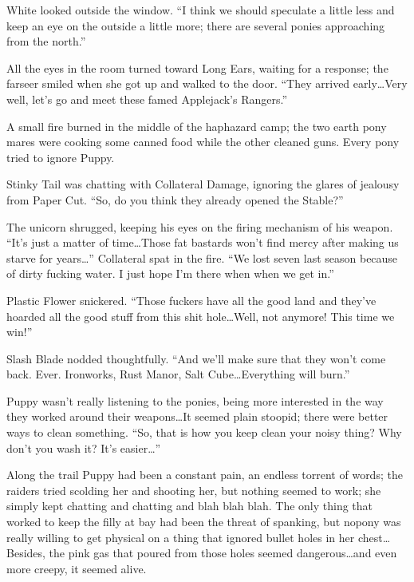 White looked outside the window. ``I think we should speculate a little less and keep an eye on the outside a little more; there are several ponies approaching from the north.''

All the eyes in the room turned toward Long Ears, waiting for a response; the farseer smiled when she got up and walked to the door. ``They arrived early\dots Very well, let's go and meet these famed Applejack's Rangers.''

\horizonline


A small fire burned in the middle of the haphazard camp; the two earth pony mares were cooking some canned food while the other cleaned guns. Every pony tried to ignore Puppy.

Stinky Tail was chatting with Collateral Damage, ignoring the glares of jealousy from Paper Cut. ``So, do you think they already opened the Stable?''

The unicorn shrugged, keeping his eyes on the firing mechanism of his weapon. ``It's just a matter of time\dots Those fat bastards won't find mercy after making us starve for years\dots'' Collateral spat in the fire. ``We lost seven last season because of dirty fucking water. I just hope I'm there when when we get in.''

Plastic Flower snickered. ``Those fuckers have all the good land and they've hoarded all the good stuff from this shit hole\dots Well, not anymore! This time we win!''

Slash Blade nodded thoughtfully. ``And we'll make sure that they won't come back. Ever. Ironworks, Rust Manor, Salt Cube\dots Everything will burn.''

Puppy wasn't really listening to the ponies, being more interested in the way they worked around their weapons\dots It seemed plain stoopid; there were better ways to clean something. ``So, that is how you keep clean your noisy thing? Why don't you wash it? It's easier\dots''

Along the trail Puppy had been a constant pain, an endless torrent of words; the raiders tried scolding her and shooting her, but nothing seemed to work; she simply kept chatting and chatting and blah blah blah. The only thing that worked to keep the filly at bay had been the threat of spanking, but nopony was really willing to get physical on a thing that ignored bullet holes in her chest\dots Besides, the pink gas that poured from those holes seemed dangerous\dots and even more creepy, it seemed alive.


